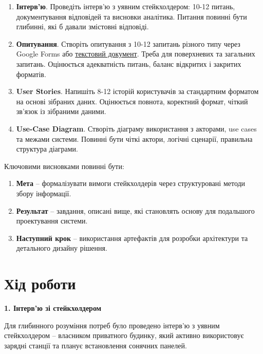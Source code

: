 \documentclass[14pt, a4paper]{extreport}
\begin{document}
	\begin{enumerate}
		\item \textbf{Інтерв'ю}. Проведіть інтерв'ю з уявним стейкхолдером: 10-12 питань, документування відповідей та висновки аналітика. Питання повинні бути глибинні, які б давали змістовні відповіді.
		
		\item \textbf{Опитування}. Створіть опитування з 10-12 запитань різного типу через Google Forms або \underline{текстовий документ}. Треба для поверхневих та загальних запитань. Оцінюється адекватність питань, баланс відкритих і закритих форматів.
		
		\item \textbf{User Stories}. Напишіть 8-12 історій користувачів за стандартним форматом на основі зібраних даних. Оцінюється повнота, коректний формат, чіткий зв'язок із зібраними даними.
		
		\item \textbf{Use-Case Diagram}. Створіть діаграму використання з акторами, use cases та межами системи. Повинні бути чіткі актори, логічні сценарії, правильна структура діаграми.
	\end{enumerate}
	
	Ключовими висновками повинні бути:
	
	\begin{enumerate}
		\item \textbf{Мета} -- формалізувати вимоги стейкхолдерів через структуровані методи збору інформації.
		
		\item \textbf{Результат} -- завдання, описані вище, які становлять основу для подальшого проектування системи.
		
		\item \textbf{Наступний крок} -- використання артефактів для розробки архітектури та детального дизайну рішення.
	\end{enumerate}
	
	\section*{Хід роботи}
	
	\textbf{1. Інтерв'ю зі стейкхолдером}
	
	Для глибинного розуміння потреб було проведено інтерв'ю з уявним стейкхолдером -- власником приватного будинку, який активно використовує зарядні станції та планує встановлення сонячних панелей. 
	
\end{document}
